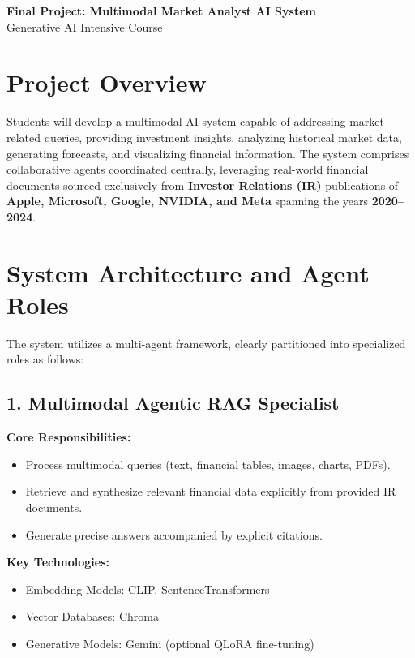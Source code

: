 \documentclass[12pt]{article}
\begin{document}
\begin{center}
    \Large\textbf{Final Project: Multimodal Market Analyst AI System}\\[0.5cm]
    \large Generative AI Intensive Course\\[0.3cm]
    \normalsize
\end{center}

\vspace{0.3cm}

\section*{Project Overview}

Students will develop a multimodal AI system capable of addressing market-related queries, providing investment insights, analyzing historical market data, generating forecasts, and visualizing financial information. The system comprises collaborative agents coordinated centrally, leveraging real-world financial documents sourced exclusively from \textbf{Investor Relations (IR)} publications of \textbf{Apple, Microsoft, Google, NVIDIA, and Meta} spanning the years \textbf{2020--2024}.

\section*{System Architecture and Agent Roles}

The system utilizes a multi-agent framework, clearly partitioned into specialized roles as follows:

\subsection*{1. Multimodal Agentic RAG Specialist}

\textbf{Core Responsibilities:}
\begin{itemize}[noitemsep]
    \item Process multimodal queries (text, financial tables, images, charts, PDFs).
    \item Retrieve and synthesize relevant financial data explicitly from provided IR documents.
    \item Generate precise answers accompanied by explicit citations.
\end{itemize}

\textbf{Key Technologies:}
\begin{itemize}[noitemsep]
    \item Embedding Models: CLIP, SentenceTransformers
    \item Vector Databases: Chroma
    \item Generative Models: Gemini (optional QLoRA fine-tuning)
\end{itemize}
\end{document}
